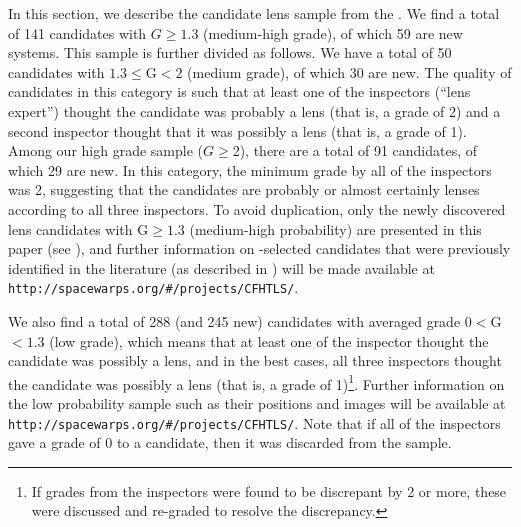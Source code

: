 \documentclass[useAMS,usenatbib,a4paper]{mn2e}
\begin{document}
In this section, we describe the \sw candidate lens sample from the
\cfhtls.  We find a total of 141 candidates with $G\ge1.3$ (medium-high
grade), of which 59 are new systems. This sample is further divided as
follows. We have a total of 50 candidates with $1.3\le$G$<2$ (medium
grade), of which 30 are new. The quality of candidates in this category
is such that at least one of the inspectors (``lens expert'') thought the candidate was
probably a lens (that is, a grade of 2) and a second inspector thought
that it was possibly a lens (that is, a grade of 1). Among our high
grade sample ($G\ge$2), there are a total of 91 candidates, of which 29
are new. In this category, the minimum grade by all of the inspectors
was 2, suggesting that the candidates are probably or almost certainly
lenses according to all three inspectors. To avoid duplication, only the
newly discovered lens candidates with G$\ge 1.3$ (medium-high
probability) are presented in this paper (see
), and further information on \sw-selected
candidates that were previously identified in the literature (as
described in ) will be made available at
\texttt{http://spacewarps.org/\#/projects/CFHTLS/}.


We also find a total of 288 (and 245 new) candidates with averaged grade
$0<$G$<1.3$ (low grade), which means that at
least one of the inspector thought the candidate was possibly a lens, and
in the best cases, all three inspectors thought the candidate was possibly
a lens (that is, a grade of 1)\footnote{If grades from the inspectors
were found to be discrepant by 2 or more, these were discussed and
re-graded to resolve the discrepancy.}. Further information on the low
probability sample such as their positions and images will be available
at \texttt{http://spacewarps.org/\#/projects/CFHTLS/}. Note that if all of the
inspectors gave a grade of 0 to a candidate, then it was discarded from
the sample.

\end{document}
